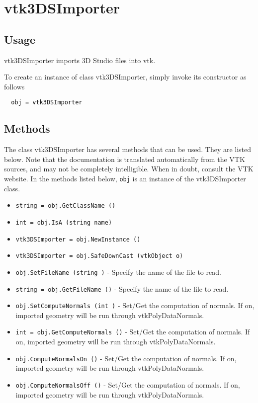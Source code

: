 \section{vtk3DSImporter}

\subsection{Usage}

 vtk3DSImporter imports 3D Studio files into vtk.

To create an instance of class vtk3DSImporter, simply
invoke its constructor as follows
\begin{verbatim}
  obj = vtk3DSImporter
\end{verbatim}
\subsection{Methods}

The class vtk3DSImporter has several methods that can be used.
  They are listed below.
Note that the documentation is translated automatically from the VTK sources,
and may not be completely intelligible.  When in doubt, consult the VTK website.
In the methods listed below, \verb|obj| is an instance of the vtk3DSImporter class.
\begin{itemize}
\item  \verb|string = obj.GetClassName ()|

\item  \verb|int = obj.IsA (string name)|

\item  \verb|vtk3DSImporter = obj.NewInstance ()|

\item  \verb|vtk3DSImporter = obj.SafeDownCast (vtkObject o)|

\item  \verb|obj.SetFileName (string )| -  Specify the name of the file to read.

\item  \verb|string = obj.GetFileName ()| -  Specify the name of the file to read.

\item  \verb|obj.SetComputeNormals (int )| -  Set/Get the computation of normals. If on, imported geometry will
 be run through vtkPolyDataNormals.

\item  \verb|int = obj.GetComputeNormals ()| -  Set/Get the computation of normals. If on, imported geometry will
 be run through vtkPolyDataNormals.

\item  \verb|obj.ComputeNormalsOn ()| -  Set/Get the computation of normals. If on, imported geometry will
 be run through vtkPolyDataNormals.

\item  \verb|obj.ComputeNormalsOff ()| -  Set/Get the computation of normals. If on, imported geometry will
 be run through vtkPolyDataNormals.

\end{itemize}
